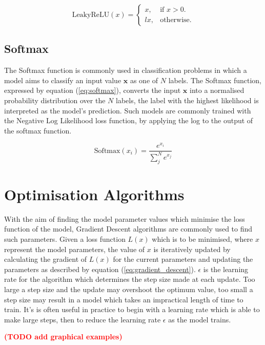 \begin{equation}\label{eq:lrelu}
    \text{LeakyReLU}(x)=\begin{cases}
      x, & \text{if $x>0$}.\\
      lx, & \text{otherwise}.
    \end{cases}
\end{equation}

\subsection{Softmax} \label{softmax}
The Softmax function is commonly used in classification problems in which a model aims to classify an input value $\bm{x}$ as one of $N$ labels.
The Softmax function, expressed by equation (\ref{eq:softmax}), converts the input $\bm{x}$ into a normalised probability distribution over the $N$ labels, the label with the highest likelihood is interpreted as the model's prediction. 
Such models are commonly trained with the Negative Log Likelihood loss function, by applying the log to the output of the softmax function.

\begin{equation}\label{eq:softmax}
    \text{Softmax}(x_i) = \frac{e^{x_i}}{\sum_j^N e^{x_j}}
\end{equation}

\section{Optimisation Algorithms}
With the aim of finding the model parameter values which minimise the loss function of the model, Gradient Descent algorithms are commonly used to find such parameters.
Given a loss function $L(x)$ which is to be minimised, where $x$ represent the model parameters, the value of $x$ is iteratively updated by calculating the gradient of $L(x)$ for the current parameters and updating the parameters as described by equation (\ref{eq:gradient_descent}).
$\epsilon$ is the learning rate for the algorithm which determines the step size made at each update.
Too large a step size and the update may overshoot the optimum value, too small a step size may result in a model which takes an impractical length of time to train. 
It's is often useful in practice to begin with a learning rate which is able to make large steps, then to reduce the learning rate $\epsilon$ as the model trains.

\textcolor{red}{\textbf{(TODO add graphical examples)}}

